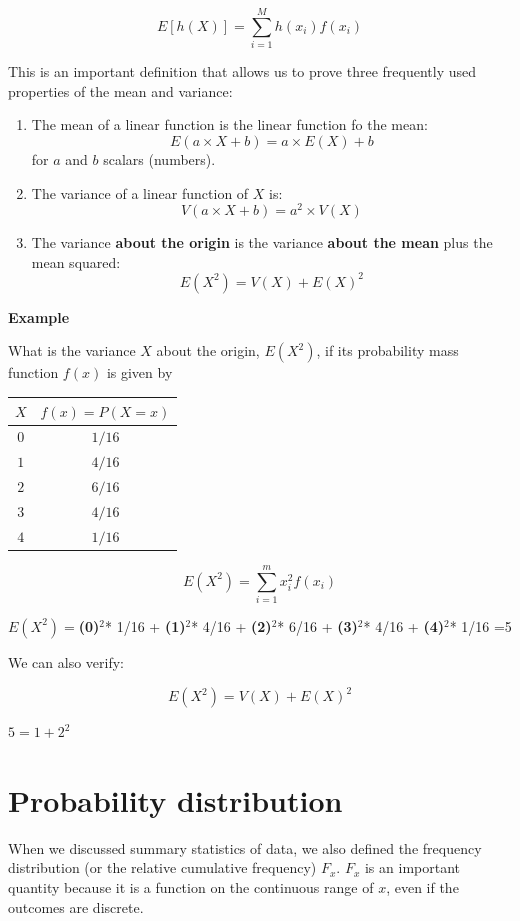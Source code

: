 \documentclass[
]{book}
\begin{document}
\[ E[h(X)]= \sum_{i=1}^M h(x_i) f(x_i) \]

This is an important definition that allows us to prove three frequently used properties of the mean and variance:

\begin{enumerate}
\def\labelenumi{\arabic{enumi})}
\item
  The mean of a linear function is the linear function fo the mean: \[E(a\times X +b)= a\times E(X) +b\] for \(a\) and \(b\) scalars (numbers).
\item
  The variance of a linear function of \(X\) is:\[V(a\times X +b)= a^2\times V(X)\]
\item
  The variance \textbf{about the origin} is the variance \textbf{about the mean} plus the mean squared: \[E(X^2)=V(X)+E(X)^2\]
\end{enumerate}

\textbf{Example}

What is the variance \(X\) about the origin, \(E(X^2)\), if its probability mass function \(f(x)\) is given by

\begin{longtable}[]{@{}cc@{}}
\toprule\noalign{}
\(X\) & \(f(x)=P(X=x)\) \\
\midrule\noalign{}
\endhead
\bottomrule\noalign{}
\endlastfoot
\(0\) & \(1/16\) \\
\(1\) & \(4/16\) \\
\(2\) & \(6/16\) \\
\(3\) & \(4/16\) \\
\(4\) & \(1/16\) \\
\end{longtable}

\[E(X^2) =\sum_{i=1}^m x_i^2 f(x_i)\]

\(E(X^2)=\)\textbf{(0)}\(^2\)* 1/16 + \textbf{(1)}\(^2\)* 4/16 + \textbf{(2)}\(^2\)* 6/16 + \textbf{(3)}\(^2\)* 4/16 + \textbf{(4)}\(^2\)* 1/16 =5

We can also verify:

\[E(X^2)=V(X)+E(X)^2\]

\(5=1+2^2\)

\hypertarget{probability-distribution}{%
\section{Probability distribution}\label{probability-distribution}}

When we discussed summary statistics of data, we also defined the frequency distribution (or the relative cumulative frequency) \(F_x\). \(F_x\) is an important quantity because it is a function on the continuous range of \(x\), even if the outcomes are discrete.
\end{document}
